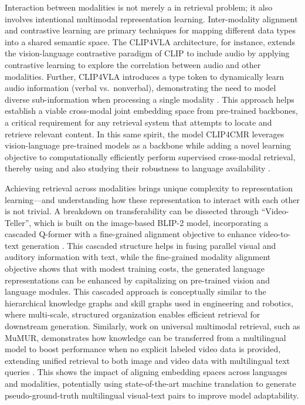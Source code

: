 \documentclass[11pt]{article}
\begin{document}
Interaction between modalities is not merely a in retrieval problem; it also involves intentional multimodal representation learning. Inter-modality alignment and contrastive learning are primary techniques for mapping different data types into a shared semantic space. The CLIP4VLA architecture, for instance, extends the vision-language contrastive paradigm of CLIP to include audio by applying contrastive learning to explore the correlation between audio and other modalities. Further, CLIP4VLA introduces a type token to dynamically learn audio information (verbal vs.~nonverbal), demonstrating the need to model diverse sub-information when processing a single modality \cite{ref196}. This approach helps establish a viable cross-modal joint embedding space from pre-trained backbones, a critical requirement for any retrieval system that attempts to locate and retrieve relevant content. In this same spirit, the model CLIP4CMR leverages vision-language pre-trained models as a backbone while adding a novel learning objective to computationally efficiently perform supervised cross-modal retrieval, thereby using and also studying their robustness to language availability \cite{ref197}.

Achieving retrieval across modalities brings unique complexity to representation learning---and understanding how these representation to interact with each other is not trivial. A breakdown on transferability can be dissected through ``Video-Teller'', which is built on the image-based BLIP-2 model, incorporating a cascaded Q-former with a fine-grained alignment objective to enhance video-to-text generation \cite{ref198}. This cascaded structure helps in fusing parallel visual and auditory information with text, while the fine-grained modality alignment objective shows that with modest training costs, the generated language representations can be enhanced by capitalizing on pre-trained vision and language modules. This cascaded approach is conceptually similar to the hierarchical knowledge graphs and skill graphs used in engineering and robotics, where multi-scale, structured organization enables efficient retrieval for downstream generation. Similarly, work on universal multimodal retrieval, such as MuMUR, demonstrates how knowledge can be transferred from a multilingual model to boost performance when no explicit labeled video data is provided, extending unified retrieval to both image and video data with multilingual text queries \cite{ref199}. This shows the impact of aligning embedding spaces across languages and modalities, potentially using state-of-the-art machine translation to generate pseudo-ground-truth multilingual visual-text pairs to improve model adaptability.
\end{document}
